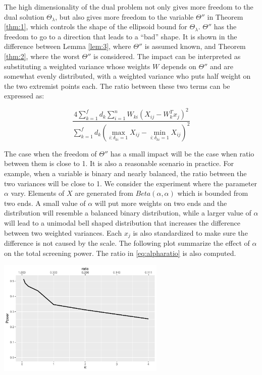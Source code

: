 The high dimensionality of the dual problem not only gives more freedom to the dual solution $\Theta_\lambda$, but also gives more freedom to the variable $\Theta''$ in Theorem \ref{thm:1}, which controls the shape of the ellipsoid bound for $\Theta_\lambda$. $\Theta''$ has the freedom to go to a direction that leads to a ``bad'' shape. It is shown in the difference between Lemma \ref{lem:3}, where $\Theta''$ is assumed known, and Theorem \ref{thm:2}, where the worst $\Theta''$ is considered. The impact can be interpreted as substituting a weighted variance whose weights $W$ depends on $\Theta''$ and are somewhat evenly distributed, with a weighted variance who puts half weight on the two extremist points each. The ratio between these two terms can be expressed as:

\begin{equation}
    \label{eq:alpharatio}
    \frac{4\sum_{k=1}^fd_k\sum_{i=1}^nW_{ki}\left(X_{ij}-W_k^Tx_j\right)^2}{\sum_{k=1}^fd_k\left(\max_{i:\delta_{ki}=1}X_{ij}-\min_{i:\delta_{ki}=1}X_{ij}\right)^2}
\end{equation}

The case when the freedom of $\Theta''$ has a small impact will be the case when ratio between them is close to 1. It is also a reasonable scenario in practice. For example, when a variable is binary and nearly balanced, the ratio between the two variances will be close to 1. We consider the experiment where the parameter $\alpha$ vary. Elements of $X$ are generated from $Beta(\alpha,\alpha)$ which is bounded from two ends. A small value of $\alpha$ will put more weights on two ends and the distribution will resemble a balanced binary distribution, while a larger value of $\alpha$ will lead to a unimodal bell shaped distribution that increases the difference between two weighted variances. Each $x_j$ is also standardized to make sure the difference is not caused by the scale. The following plot summarize the effect of $\alpha$ on the total screening power. The ratio in \eqref{eq:alpharatio} is also computed.

\begin{center}
    \includegraphics[width=0.6\textwidth]{alpha.pdf}
\end{center}

